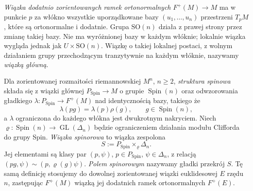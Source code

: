 \emph{Wiązka dodatnio zorientowanych ramek
ortonormalnych} $F^+(M)\to M$ ma w punkcie $p$
za włókno wszystkie uporządkowane bazy
$(u_1,\ldots,u_n)$ przestrzeni $T_pM$,
które są ortonormalne i dodatnie.
Grupa $\mathrm{SO}(n)$ działa z prawej strony
przez zmianę takiej bazy. Nie ma wyróżnionej
bazy w każdym włóknie; lokalnie wiązka wygląda
jednak jak $U\times\mathrm{SO}(n)$.
Wiązkę o takiej lokalnej postaci, z wolnym
działaniem grupy przechodzącym tranzytywnie
na każdym włóknie, nazywamy \emph{wiązką główną}.

\begin{definicja}
\label{def:struktura-spinowa}
Dla zorientowanej rozmaitości riemannowskiej
$M^n$, $n\geq2$, \emph{struktura spinowa}
składa się z wiązki głównej
$P_{\mathrm{Spin}}\to M$ o grupie
$\operatorname{Spin}(n)$ oraz odwzorowania
gładkiego $\lambda:P_{\mathrm{Spin}}\to F^+(M)$
nad identycznością bazy, takiego że
\[
 \lambda(pg)=\lambda(p)\rho(g),
 \qquad g\in\operatorname{Spin}(n),
\]
a $\lambda$ ograniczona do każdego włókna
jest dwukrotnym nakryciem.
Niech $\varrho:\operatorname{Spin}(n)\to\operatorname{GL}(\Delta_n)$
będzie ograniczeniem działania modułu Clifforda do grupy Spin.
\emph{Wiązka spinorowa} to wiązka zespolona
\[
 S:=P_{\mathrm{Spin}}\times_{\varrho}\Delta_n.
\]
Jej elementami są klasy par $(p,\psi)$,
$p\in P_{\mathrm{Spin}}$, $\psi\in\Delta_n$,
z relacją $(pg,\psi)\sim(p,\varrho(g)\psi)$.
\emph{Polem spinorowym} nazywamy gładki przekrój $S$.
Tę samą definicję stosujemy do dowolnej zorientowanej wiązki
euklidesowej $E$ rzędu $n$, zastępując $F^+(M)$ wiązką jej
dodatnich ramek ortonormalnych $F^+(E)$.
\end{definicja}

